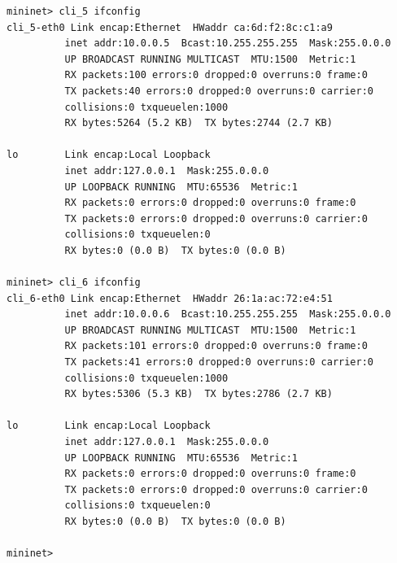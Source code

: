 \documentclass{article}
\begin{document}
\begin{Verbatim}
mininet> cli_5 ifconfig
cli_5-eth0 Link encap:Ethernet  HWaddr ca:6d:f2:8c:c1:a9
          inet addr:10.0.0.5  Bcast:10.255.255.255  Mask:255.0.0.0
          UP BROADCAST RUNNING MULTICAST  MTU:1500  Metric:1
          RX packets:100 errors:0 dropped:0 overruns:0 frame:0
          TX packets:40 errors:0 dropped:0 overruns:0 carrier:0
          collisions:0 txqueuelen:1000
          RX bytes:5264 (5.2 KB)  TX bytes:2744 (2.7 KB)

lo        Link encap:Local Loopback
          inet addr:127.0.0.1  Mask:255.0.0.0
          UP LOOPBACK RUNNING  MTU:65536  Metric:1
          RX packets:0 errors:0 dropped:0 overruns:0 frame:0
          TX packets:0 errors:0 dropped:0 overruns:0 carrier:0
          collisions:0 txqueuelen:0
          RX bytes:0 (0.0 B)  TX bytes:0 (0.0 B)

mininet> cli_6 ifconfig
cli_6-eth0 Link encap:Ethernet  HWaddr 26:1a:ac:72:e4:51
          inet addr:10.0.0.6  Bcast:10.255.255.255  Mask:255.0.0.0
          UP BROADCAST RUNNING MULTICAST  MTU:1500  Metric:1
          RX packets:101 errors:0 dropped:0 overruns:0 frame:0
          TX packets:41 errors:0 dropped:0 overruns:0 carrier:0
          collisions:0 txqueuelen:1000
          RX bytes:5306 (5.3 KB)  TX bytes:2786 (2.7 KB)

lo        Link encap:Local Loopback
          inet addr:127.0.0.1  Mask:255.0.0.0
          UP LOOPBACK RUNNING  MTU:65536  Metric:1
          RX packets:0 errors:0 dropped:0 overruns:0 frame:0
          TX packets:0 errors:0 dropped:0 overruns:0 carrier:0
          collisions:0 txqueuelen:0
          RX bytes:0 (0.0 B)  TX bytes:0 (0.0 B)

mininet>

\end{Verbatim}
\end{document}
